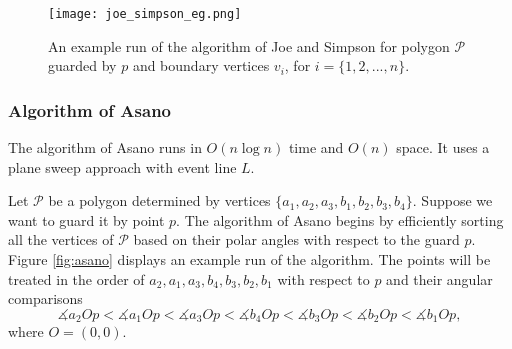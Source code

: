 \begin{figure}[h!]
	\centering
	\texttt{[image: joe\_simpson\_eg.png]}
	\caption{An example run of the algorithm of Joe and Simpson \cite{joe1987corrections} for polygon $\mathcal P$ guarded by $p$ and boundary vertices $v_i$, for $i = \{1, 2, ..., n\}$.}
	\label{fig:joe}
\end{figure}



\subsubsection{Algorithm of Asano \cite{asano1985efficient}}
The algorithm of Asano \cite{asano1985efficient} runs in $O(n \log n)$ time and $O(n)$ space. It uses a plane sweep approach with event line $L$. 

Let $\mathcal P$ be a polygon determined by vertices $\{a_1, a_2, a_3, b_1, b_2, b_3, b_4\}$. Suppose we want to guard it by point $p$. The algorithm of Asano \cite{asano1985efficient} begins by efficiently sorting all the vertices of $\mathcal P$ based on their polar angles with respect to the guard $p$. Figure \ref{fig:asano} displays an example run of the algorithm. The points will be treated in the order of $a_2, a_1, a_3, b_4, b_3, b_2, b_1$ with respect to $p$ and their angular comparisons $$\measuredangle a_2Op < \measuredangle a_1Op < \measuredangle a_3Op < \measuredangle b_4Op < \measuredangle b_3Op < \measuredangle b_2Op < \measuredangle b_1Op,$$ where $O = (0, 0)$. 

